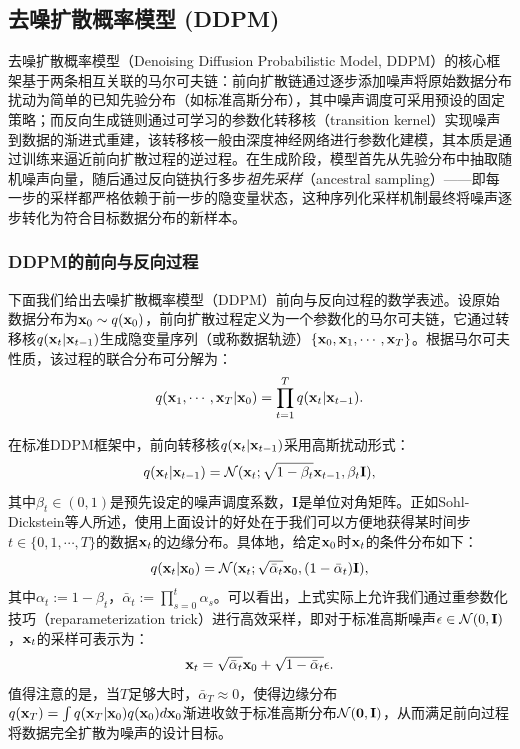 \documentclass[11pt,a4paper,UTF8]{ctexart}
\begin{document}
\subsection{去噪扩散概率模型 (DDPM)}

去噪扩散概率模型（Denoising Diffusion Probabilistic Model, DDPM）的核心框架基于两条相互关联的马尔可夫链：前向扩散链通过逐步添加噪声将原始数据分布扰动为简单的已知先验分布（如标准高斯分布），其中噪声调度可采用预设的固定策略；而反向生成链则通过可学习的参数化转移核（transition kernel）实现噪声到数据的渐进式重建，该转移核一般由深度神经网络进行参数化建模，其本质是通过训练来逼近前向扩散过程的逆过程。在生成阶段，模型首先从先验分布中抽取随机噪声向量，随后通过反向链执行多步\emph{祖先采样}（ancestral sampling）\cite{koller2009probabilistic}——即每一步的采样都严格依赖于前一步的隐变量状态，这种序列化采样机制最终将噪声逐步转化为符合目标数据分布的新样本。

\subsubsection{DDPM的前向与反向过程}

下面我们给出去噪扩散概率模型（DDPM）前向与反向过程的数学表述。设原始数据分布为$\mathbf{x}_0\sim q(\mathbf{x}_0)$，前向扩散过程定义为一个参数化的马尔可夫链，它通过转移核$q(\mathbf{x}_t|\mathbf{x}_{t-1})$生成隐变量序列（或称数据轨迹）$\{\mathbf{x}_0,\mathbf{x}_1,\cdots,\mathbf{x}_T\}$。根据马尔可夫性质，该过程的联合分布可分解为：
\begin{equation*}
    q(\mathbf{x}_1,\cdots,\mathbf{x}_T|\mathbf{x}_0)=\prod_{t=1}^T q(\mathbf{x}_t|\mathbf{x}_{t-1}).
\end{equation*}

在标准DDPM框架中，前向转移核$q(\mathbf{x}_t|\mathbf{x}_{t-1})$采用高斯扰动形式：
\begin{equation}
    q(\mathbf{x}_t|\mathbf{x}_{t-1}) =\mathcal{N}(\mathbf{x}_t;\sqrt{1-\beta_t}\mathbf{x}_{t-1},\beta_t\mathbf{I}),
\label{ddpm:forward_process}
\end{equation}
其中$\beta_t\in(0,1)$是预先设定的噪声调度系数，$\mathbf{I}$是单位对角矩阵。正如Sohl-Dickstein等人\cite{sohldickstein2015diffusion}所述，使用上面设计的好处在于我们可以方便地获得某时间步$t\in\{0,1,\cdots,T\}$的数据$\mathbf{x}_t$的边缘分布。具体地，给定$\mathbf{x}_0$时$\mathbf{x}_t$的条件分布如下：
\begin{equation}
    q(\mathbf{x}_t|\mathbf{x}_0)=\mathcal{N}(\mathbf{x}_t;\sqrt{\bar{\alpha}_t}\mathbf{x}_0,(1-\bar{\alpha}_t)\mathbf{I}),
\label{ddpm:bar_alpha}
\end{equation}
其中$\alpha_t:=1-\beta_t$，$\bar{\alpha}_t:=\prod_{s=0}^t\alpha_s$。可以看出，上式实际上允许我们通过重参数化技巧（reparameterization trick）进行高效采样，即对于标准高斯噪声$\epsilon\in\mathcal{N}(0,\mathbf{I})$，$\mathbf{x}_t$的采样可表示为：
\begin{equation*}
    \mathbf{x}_t=\sqrt{\bar{\alpha}_t}\mathbf{x}_0 + \sqrt{1-\bar{\alpha}_t}\epsilon.
\end{equation*}
值得注意的是，当$T$足够大时，$\bar{\alpha}_T\approx 0$，使得边缘分布$q(\mathbf{x}_T)=\int q(\mathbf{x}_T|\mathbf{x}_0)q(\mathbf{x}_0)d\mathbf{x}_0$渐进收敛于标准高斯分布$\mathcal{N}(\mathbf{0},\mathbf{I})$，从而满足前向过程将数据完全扩散为噪声的设计目标。
\end{document}
